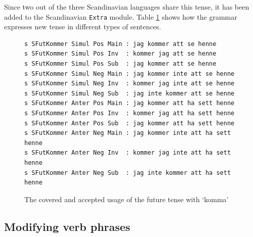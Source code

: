 \documentclass{report}
\begin{document}
Since two out of the three Scandinavian languages share this
tense, it has been added to the Scandinavian \verb-Extra- module.
Table \ref{fig:kommeratt} shows how the grammar expresses new tense
in different types of sentences.
\begin{figure}[h]
\begin{verbatim}
s SFutKommer Simul Pos Main : jag kommer att se henne
s SFutKommer Simul Pos Inv  : kommer jag att se henne
s SFutKommer Simul Pos Sub  : jag kommer att se henne
s SFutKommer Simul Neg Main : jag kommer inte att se henne
s SFutKommer Simul Neg Inv  : kommer jag inte att se henne
s SFutKommer Simul Neg Sub  : jag inte kommer att se henne
s SFutKommer Anter Pos Main : jag kommer att ha sett henne
s SFutKommer Anter Pos Inv  : kommer jag att ha sett henne
s SFutKommer Anter Pos Sub  : jag kommer att ha sett henne
s SFutKommer Anter Neg Main : jag kommer inte att ha sett henne
s SFutKommer Anter Neg Inv  : kommer jag inte att ha sett henne
s SFutKommer Anter Neg Sub  : jag inte kommer att ha sett henne
\end{verbatim}
\caption{The covered and accepted usage of the future tense with `komma'}
  \label{fig:kommeratt}
\end{figure}

%
\subsection{Modifying verb phrases}
\end{document}
